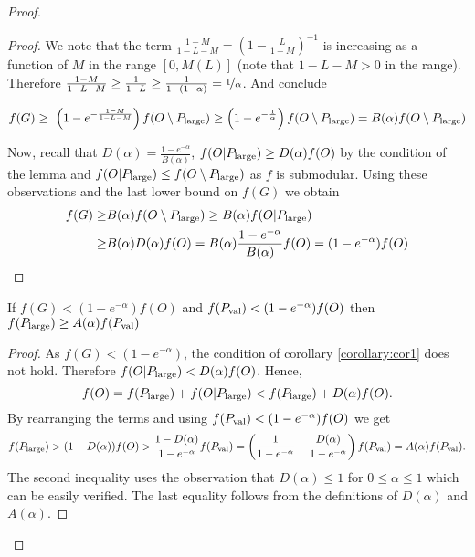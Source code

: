 \documentclass[a4paper]{article}
\begin{document}
\begin{proof}
\begin{proof}
  	We note that the term $\frac{1-M}{1-L-M} = \left(  1- \frac{L}{1-M} \right)^{-1}$ is increasing as a function
  	of $M$  in the range $[0, M(L)]$ (note that $1-L-M >0$ in the range).
  	Therefore $\frac{1-M}{1-L-M} \geq  \frac{1 }{1-L}  \geq \frac{1}{1-(1-\alpha)} = \nicefrac[]{1}{\alpha}$. And conclude
  		
  	  $$f(G)
  	\geq \ \left(1-e^{- \frac{1-M }{1-L-M}}\right) f(O\setminus P_{\text{large}}) \geq \left( 1- e ^ {- \frac{1}{ \alpha}} \right)f(O\setminus P_{\text{large}})
  	= B(\alpha)f(O\setminus P_{\text{large}}) $$
  	
  	Now, recall that $D(\alpha)= \frac{1-e^{-\alpha}}{B(\alpha)}$,
	$f(O|P_{\text{large}}) \geq D(\alpha) f(O)$ by the condition of the
	lemma and $f(O|P_{\text{large}}) \leq f(O\setminus P_{\text{large}})$ as
	$f$ is submodular. Using these observations and the last lower
	bound on $f(G)$ we obtain
\begin{align*}
f(G) \geq& B(\alpha)f(O\setminus P_{\text{large}})  \geq
B(\alpha) f(O|P_{\text{large}})\\  \geq&
B(\alpha ) D(\alpha ) f(O)
= B(\alpha)\frac{1-e^{-\alpha}}{B(\alpha) }f(O)= (1-e^{-\alpha})f(O)
\end{align*}

	\end{proof}

	\begin{corollary}
		\label{corollary:cor2}
		If $f(G)< (1-e^{-\alpha})f(O)$ and $f(P_{\text{val}}) < (1-e^{-\alpha})f(O)$ then
		$f(P_{\text{large}}) \geq A(\alpha) f(P_{\text{val}})$
		\end{corollary}
	\begin{proof}
		As $f(G)< (1-e^{-\alpha})$, the condition of corollary \ref{corollary:cor1} does not hold. Therefore
		$f(O|P_{\text{large}})< D(\alpha) f(O)$. Hence,
		$$f(O)= f(P_{\text{large}}) + f(O|P_{\text{large}}) < f(P_{\text{large}}) + D(\alpha) f(O).$$
		By rearranging the terms and using $f(P_{\text{val}}) < (1-e^{-\alpha})f(O)$
		we get
		$$
		f(P_{\text{large}}) > (1-D(\alpha)) f(O) > \frac{1-D(\alpha)}{1-e^{-\alpha}} f(P_{\text{val}})
		= \left(\frac{1}{1-e^{-\alpha}} - \frac{D(\alpha)}{1-e^{-\alpha}}\right) f(P_{\text{val}}) = A(\alpha) f(P_{\text{val}}).
		$$
		The second inequality uses the observation that $D(\alpha) \leq 1$ for $0\leq \alpha \leq 1$ which can be easily verified. The last equality follows from the definitions
		of $D(\alpha)$ and $A(\alpha)$.
		

\end{proof}
\end{proof}
\end{document}
